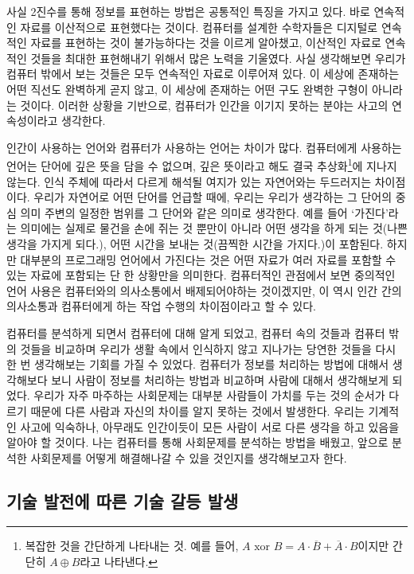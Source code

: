 \documentclass{article}
\begin{document}
사실 2진수를 통해 정보를 표현하는 방법은 공통적인 특징을 가지고 있다.
바로 연속적인 자료를 이산적으로 표현했다는 것이다.
컴퓨터를 설계한 수학자들은 디지털로 연속적인 자료를 표현하는 것이 불가능하다는 것을 이르게 알아챘고,
이산적인 자료로 연속적인 것들을 최대한 표현해내기 위해서 많은 노력을 기울였다.
사실 생각해보면 우리가 컴퓨터 밖에서 보는 것들은 모두 연속적인 자료로 이루어져 있다.
이 세상에 존재하는 어떤 직선도 완벽하게 곧지 않고,
이 세상에 존재하는 어떤 구도 완벽한 구형이 아니라는 것이다.
이러한 상황을 기반으로,
컴퓨터가 인간을 이기지 못하는 분야는 사고의 연속성이라고 생각한다.

인간이 사용하는 언어와 컴퓨터가 사용하는 언어는 차이가 많다.
컴퓨터에게 사용하는 언어는 단어에 깊은 뜻을 담을 수 없으며, 깊은 뜻이라고 해도 결국
추상화\footnote{복잡한 것을 간단하게 나타내는 것. 예를 들어,
$A \text{ xor } B = A \cdot \overline B + \overline A \cdot B$이지만
간단히 $A \oplus B$라고 나타낸다.}에 지나지 않는다.
인식 주체에 따라서 다르게 해석될 여지가 있는 자연어와는 두드러지는 차이점이다.
우리가 자연어로 어떤 단어를 언급할 때에, 우리는 우리가 생각하는 그 단어의 중심 의미 주변의 일정한
범위를 그 단어와 같은 의미로 생각한다. 예를 들어 `가진다'라는 의미에는 실제로 물건을 손에 쥐는 것
뿐만이 아니라 어떤 생각을 하게 되는 것(나쁜 생각을 가지게 되다.),
어떤 시간을 보내는 것(끔찍한 시간을 가지다.)이 포함된다.
하지만 대부분의 프로그래밍 언어에서 가진다는 것은 어떤 자료가 여러 자료를 포함할 수 있는 자료에
포함되는 단 한 상황만을 의미한다.
컴퓨터적인 관점에서 보면 중의적인 언어 사용은 컴퓨터와의 의사소통에서 배제되어야하는 것이겠지만,
이 역시 인간 간의 의사소통과 컴퓨터에게 하는 작업 수행의 차이점이라고 할 수 있다.

컴퓨터를 분석하게 되면서 컴퓨터에 대해 알게 되었고, 컴퓨터 속의 것들과 컴퓨터 밖의 것들을 비교하며
우리가 생활 속에서 인식하지 않고 지나가는 당연한 것들을 다시 한 번 생각해보는 기회를 가질 수
있었다.
컴퓨터가 정보를 처리하는 방법에 대해서 생각해보다 보니 사람이 정보를 처리하는 방법과
비교하며 사람에 대해서 생각해보게 되었다.
우리가 자주 마주하는 사회문제는 대부분 사람들이 가치를 두는 것의 순서가 다르기 때문에
다른 사람과 자신의 차이를 알지 못하는 것에서 발생한다.
우리는 기계적인 사고에 익숙하나, 아무래도 인간이듯이 모든 사람이 서로 다른 생각을 하고 있음을
알아야 할 것이다.
나는 컴퓨터를 통해 사회문제를 분석하는 방법을 배웠고, 앞으로 분석한 사회문제를 어떻게 해결해나갈
수 있을 것인지를 생각해보고자 한다.

\subsection{기술 발전에 따른 기술 갈등 발생}
\end{document}
